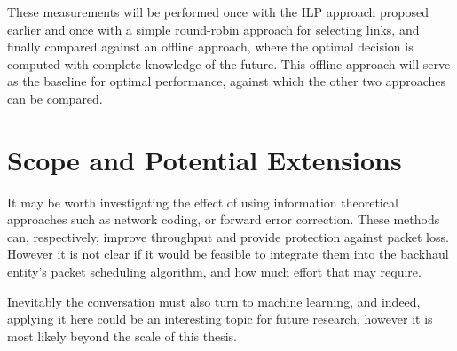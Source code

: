 These measurements will be performed once with the ILP approach proposed earlier and once with a simple round-robin approach for selecting links, and finally compared against an offline approach, where the optimal decision is computed with complete knowledge of the future. This offline approach will serve as the baseline for optimal performance, against which the other two approaches can be compared.

\section{Scope and Potential Extensions}

It may be worth investigating the effect of using information theoretical approaches such as network coding, or forward error correction. These methods can, respectively, improve throughput and provide protection against packet loss. However it is not clear if it would be feasible to integrate them into the backhaul entity's packet scheduling algorithm, and how much effort that may require.

Inevitably the conversation must also turn to machine learning, and indeed, applying it here could be an interesting topic for future research, however it is most likely beyond the scale of this thesis.







\nocite{tsai2006review}
\nocite{tao2005improving}
\nocite{kundel2022user}
\nocite{goldenberg2004optimizing}
\nocite{lange2015performance}
\nocite{tarique2009survey}
\nocite{tschoke2021time}
\nocite{ganichev2010yamr}
\nocite{habib2007improving}
\nocite{guo2004experiences}
\nocite{akella2003measurement}
\nocite{ergencc2021reliability}
\nocite{tao2004application}
\nocite{alwan2010multi}
\nocite{prados2021asynchronous}
\nocite{zhang2016fundamentals}
\nocite{chen2020collaborative}
\nocite{akella2008performance}
\nocite{andreoli2017mobile}
\nocite{huang2008multiconstrained}



